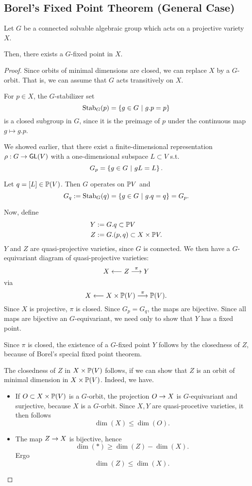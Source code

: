 \subsection{Borel's Fixed Point Theorem (General Case)}

\begin{theorem}
	Let $G$ be a connected solvable algebraic group which acts on a projective variety $X$.
	
	Then, there exists a $G$-fixed point in $X$.
\end{theorem}
\begin{proof}
	Since orbits of minimal dimensions are closed, we can replace $X$ by a $G$-orbit. That is, we can assume that $G$ acts transitively on $X$.
	
	For $p \in X$, the $G$-stabilizer set
	\[ \mathrm{Stab}_G(p) = \set{g \in G}{g.p = p} \]
	is a closed subgroup in $G$, since it is the preimage of $p$ under the continuous map $g\mapsto g.p$.
	
	We showed earlier, that there exist a finite-dimensional representation $\rho : G \pfeil{} \GL(V)$ with a one-dimensional subspace $L \subset V$ s.t.
	\[ G_p = \set{ g \in G}{gL = L}. \]
	
	Let $q = [L] \in \P(V)$. Then $G$ operates on $\P V$ and
	\[ G_q := \mathrm{Stab}_G(q) = \set{g \in G}{g.q = q} = G_p.\]
	
	Now, define
	\begin{align*}
	Y &:= G.q \subset \P V\\
	Z&:= G.(p,q) \subset X \times \P V.
	\end{align*}
	$Y$ and $Z$ are quasi-projective varieties, since $G$ is connected. We then have a $G$-equivariant diagram of quasi-projective varieties:
	\[ X \longleftarrow Z \Pfeil{\pi} Y \]
	via
	\[ X \longleftarrow X \times \P(V) \Pfeil{\pi} \P(V). \]
	Since $X$ is projective, $\pi$ is closed. Since $G_p = G_q$, the maps are bijective.
	Since all maps are bijective an $G$-equivariant, we need only to show that $Y$ has a fixed point.
	
	Since $\pi$ is closed, the existence of a $G$-fixed point $Y$ follows by the closedness of $Z$, because of Borel's special fixed point theorem.
	
	The closedness of $Z$ in $X \times \P(V)$ follows, if we can show that $Z$ is an orbit of minimal dimension in $X\times \P(V)$.
	Indeed, we have.
	\begin{itemize}
		\item If $O \subset X \times \P(V)$ is a $G$-orbit, the projection $O \pfeil{} X$  is $G$-equivariant and surjective, because $X$ is a $G$-orbit. Since $X,Y$ are quasi-procetive varieties, it then follows
		\[ \dim(X) \leq \dim(O). \]
		\item The map $Z \pfeil{} X$ is bijective, hence
		\[ \dim(*) \geq \dim(Z) - \dim (X). \]
		Ergo
		\[ \dim(Z) \leq \dim(X). \]
	\end{itemize}
\end{proof}